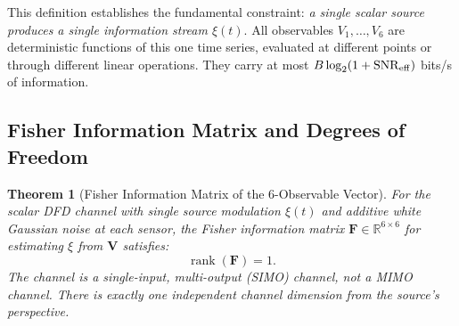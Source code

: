 \documentclass[aps,prd,twocolumn,superscriptaddress,nofootinbib]{revtex4-2}
\newcommand{\SNR}{\mathrm{SNR}}
\DeclareMathOperator{\rank}{rank}
\newtheorem{theorem}{Theorem}
\begin{document}
This definition establishes the fundamental constraint:
\emph{a single scalar source produces a single information stream $\xi(t)$}.
All observables $V_1,\ldots,V_6$ are deterministic functions of this
one time series, evaluated at different points or through different linear
operations. They carry at most $B\log_2(1+\SNR_{\rm eff})$ bits/s of information.

\subsection{Fisher Information Matrix and Degrees of Freedom}

\begin{theorem}[Fisher Information Matrix of the 6-Observable Vector]
\label{thm:FIM}
For the scalar DFD channel with single source modulation $\xi(t)$
and additive white Gaussian noise at each sensor, the Fisher information
matrix $\mathbf{F} \in \mathbb{R}^{6 \times 6}$ for estimating $\xi$ from
$\mathbf{V}$ satisfies:
\begin{equation}
\rank(\mathbf{F}) = 1.
\label{eq:rank-FIM}
\end{equation}
The channel is a \emph{single-input, multi-output} (SIMO) channel, not
a MIMO channel. There is exactly one independent channel dimension from the
source's perspective.
\end{theorem}
\end{document}
